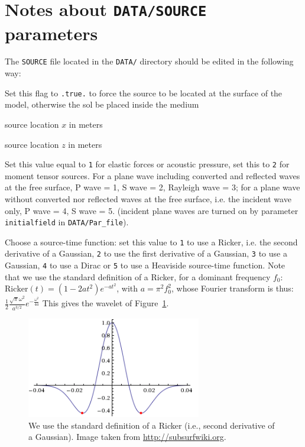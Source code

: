 \section*{Notes about \texttt{DATA/SOURCE} parameters}


The \texttt{SOURCE} file located in the \texttt{DATA/} directory should be edited in the following way:
%
\begin{description}[font=\ttfamily]
\item[source\_surf] Set this flag to \texttt{.true.} to force the source to be located at the surface of the model, otherwise
the sol be placed inside the medium

\item[xs] source location $x$ in meters

\item[zs] source location $z$ in meters

\item[source\_type] Set this value equal to \texttt{1} for elastic forces or acoustic pressure,
set this to \texttt{2} for moment tensor sources.
For a plane wave including converted and reflected waves at the free surface, P wave = 1, S wave = 2, Rayleigh wave = 3;
for a plane wave without converted nor reflected waves at the free surface, i.e. the incident wave only, P wave = 4, S wave = 5.
(incident plane waves are turned on by parameter \texttt{initialfield} in \texttt{DATA/Par\_file}).

\item[time\_function\_type] Choose a source-time function: set this value to \texttt{1} to use a Ricker, i.e. the second derivative of a Gaussian,
\texttt{2} to use the first derivative of a Gaussian, \texttt{3} to use a Gaussian, \texttt{4} to use a Dirac or \texttt{5} to use a Heaviside source-time function.
Note that we use the standard definition of a Ricker, for a dominant frequency $f_0$:
$\mathrm{Ricker}(t) = (1 - 2 a t^2) e^{-a t^2}$, with $a = \pi^2 f_0^2$,
whose Fourier transform is thus:
$\frac{1}{2} \frac{\sqrt{\pi}\omega^2}{a^{3/2}}e^{-\frac{\omega^2}{4 a}}$
This gives the wavelet of Figure~\ref{fig:RickerWavelet}.
\begin{figure}[htbp]
\centering
\includegraphics[width=3in]{figures/Ricker_wavelet.png}
\caption{We use the standard definition of a Ricker (i.e., second derivative of a Gaussian). Image taken from \url{http://subsurfwiki.org}.}
\label{fig:RickerWavelet}
\end{figure}


\end{description}
